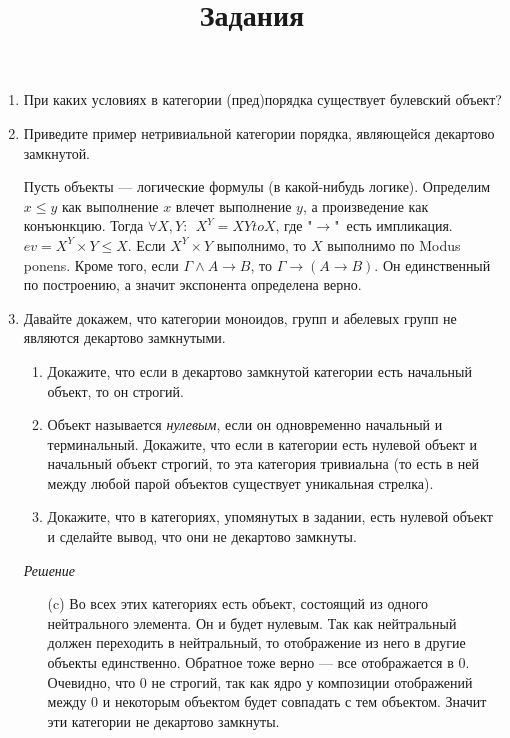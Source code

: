 \documentclass[draft]{article}
\begin{document}
\title{Задания}
\maketitle

\begin{enumerate}

\item При каких условиях в категории (пред)порядка существует булевский объект?

\item Приведите пример нетривиальной категории порядка, являющейся декартово замкнутой.

Пусть объекты --- логические формулы (в какой-нибудь логике). Определим $x \leq y$ как выполнение $x$ влечет выполнение $y$, а произведение как конъюнкцию. Тогда $\forall X, Y: ~~X^Y = XYto X$, где "$\to$"\  есть импликация. $ev = X^Y\times Y \leq X$. Если $X^Y\times Y$ выполнимо, то $X$ выполнимо по Modus ponens. Кроме того, если $\Gamma \land A \to B$, то $\Gamma \to (A \to B)$. Он единственный по построению, а значит экспонента определена верно. 

\item Давайте докажем, что категории моноидов, групп и абелевых групп не являются декартово замкнутыми.
\begin{enumerate}
\item Докажите, что если в декартово замкнутой категории есть начальный объект, то он строгий.
\item Объект называется \emph{нулевым}, если он одновременно начальный и терминальный.
Докажите, что если в категории есть нулевой объект и начальный объект строгий, то эта категория тривиальна (то есть в ней между любой парой объектов существует уникальная стрелка).
\item Докажите, что в категориях, упомянутых в задании, есть нулевой объект и сделайте вывод, что они не декартово замкнуты.
\end{enumerate}
\textit{Решение}
\begin{enumerate}
\item[(c)] Во всех этих категориях есть объект, состоящий из одного нейтрального элемента. Он и будет нулевым. Так как нейтральный должен переходить в нейтральный, то отображение из него в другие объекты единственно. Обратное тоже верно --- все отображается в 0. Очевидно, что 0 не строгий, так как ядро у композиции отображений между 0 и некоторым объектом будет совпадать с тем объектом. Значит эти категории не декартово замкнуты.
\end{enumerate}


\end{enumerate}
\end{document}
